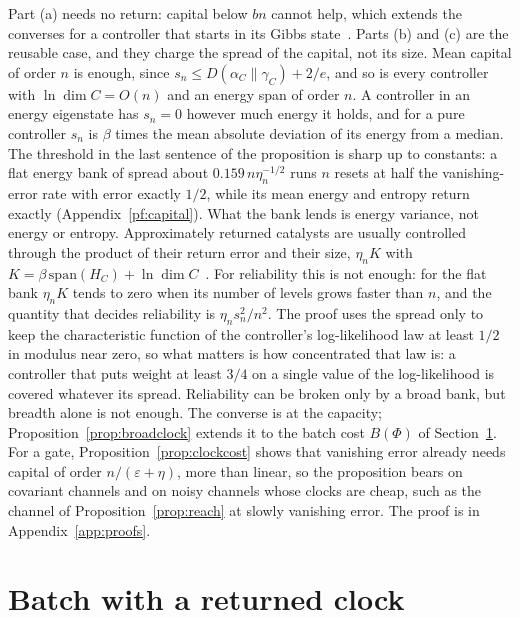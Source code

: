 \documentclass[11pt]{article}
\theoremstyle{definition}
\theoremstyle{remark}
\begin{document}
Part (a) needs no return: capital below $bn$ cannot help, which extends the converses for a controller that starts in its Gibbs state~\cite{SaveWork}. Parts (b) and (c) are the reusable case, and they charge the spread of the capital, not its size. Mean capital of order $n$ is enough, since $s_n\le D(\alpha_C\|\gamma_C)+2/e$, and so is every controller with $\ln\dim C=O(n)$ and an energy span of order $n$. A controller in an energy eigenstate has $s_n=0$ however much energy it holds, and for a pure controller $s_n$ is $\beta$ times the mean absolute deviation of its energy from a median. The threshold in the last sentence of the proposition is sharp up to constants: a flat energy bank of spread about $0.159\,n\eta_n^{-1/2}$ runs $n$ resets at half the vanishing-error rate with error exactly $1/2$, while its mean energy and entropy return exactly (Appendix~\ref{pf:capital}). What the bank lends is energy variance, not energy or entropy. Approximately returned catalysts are usually controlled through the product of their return error and their size, $\eta_nK$ with $K=\beta\,\mathrm{span}(H_C)+\ln\dim C$~\cite{BrandaoSecondLaws15,NgCatalysis15}. For reliability this is not enough: for the flat bank $\eta_nK$ tends to zero when its number of levels grows faster than $n$, and the quantity that decides reliability is $\eta_ns_n^2/n^2$. The proof uses the spread only to keep the characteristic function of the controller's log-likelihood law at least $1/2$ in modulus near zero, so what matters is how concentrated that law is: a controller that puts weight at least $3/4$ on a single value of the log-likelihood is covered whatever its spread. Reliability can be broken only by a broad bank, but breadth alone is not enough. The converse is at the capacity; Proposition~\ref{prop:broadclock} extends it to the batch cost $B(\Phi)$ of Section~\ref{sec:batch}. For a gate, Proposition~\ref{prop:clockcost} shows that vanishing error already needs capital of order $n/(\varepsilon+\eta)$, more than linear, so the proposition bears on covariant channels and on noisy channels whose clocks are cheap, such as the channel of Proposition~\ref{prop:reach} at slowly vanishing error. The proof is in Appendix~\ref{app:proofs}.

\section{Batch with a returned clock}\label{sec:batch}
\end{document}
